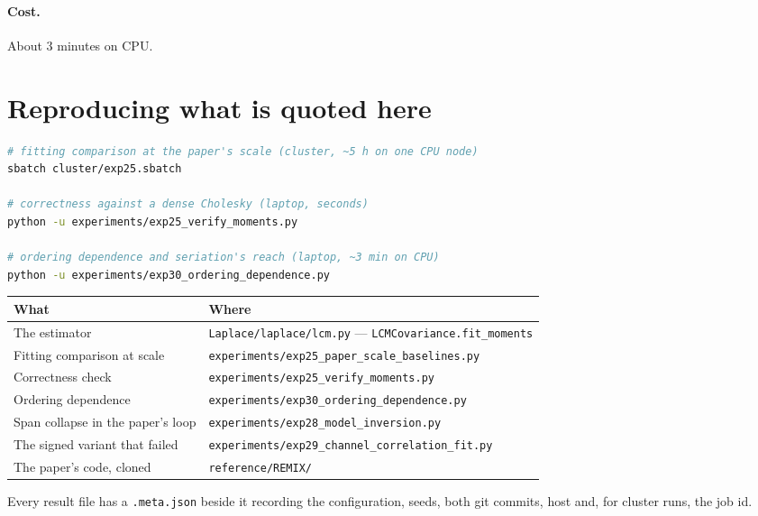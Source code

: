 \documentclass[11pt,a4paper]{article}
\newcommand{\code}[1]{\texttt{#1}}
\begin{document}
\paragraph{Cost.} About 3 minutes on CPU.

\section{Reproducing what is quoted here}

\begin{lstlisting}[style=py,language=bash,basicstyle=\ttfamily\footnotesize]
# fitting comparison at the paper's scale (cluster, ~5 h on one CPU node)
sbatch cluster/exp25.sbatch

# correctness against a dense Cholesky (laptop, seconds)
python -u experiments/exp25_verify_moments.py

# ordering dependence and seriation's reach (laptop, ~3 min on CPU)
python -u experiments/exp30_ordering_dependence.py
\end{lstlisting}

\begin{center}
\begin{tabular}{@{}p{}p{}@{}}
\toprule
What & Where \\
\midrule
The estimator & \code{Laplace/laplace/lcm.py} --- \code{LCMCovariance.fit\_moments} \\
Fitting comparison at scale & \code{experiments/exp25\_paper\_scale\_baselines.py} \\
Correctness check & \code{experiments/exp25\_verify\_moments.py} \\
Ordering dependence & \code{experiments/exp30\_ordering\_dependence.py} \\
Span collapse in the paper's loop & \code{experiments/exp28\_model\_inversion.py} \\
The signed variant that failed & \code{experiments/exp29\_channel\_correlation\_fit.py} \\
The paper's code, cloned & \code{reference/REMIX/} \\
\bottomrule
\end{tabular}
\end{center}

\noindent
Every result file has a \code{.meta.json} beside it recording the configuration, seeds, both
git commits, host and, for cluster runs, the job id.
\end{document}

